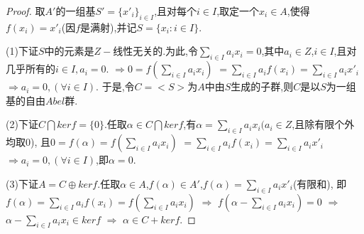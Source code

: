 \documentclass[UTF8]{article}
\begin{document}
\begin{proof}
	取$A'$的一组基$S'=\{x'_i\}_{i\in I}$,且对每个$i\in I$,取定一个$x_i\in A$,使得$f(x_i)=x'_i$(因$f$是满射),并记$S=\{x_i:i\in I\}$.
	
	(1)下证$S$中的元素是$Z-$线性无关的.为此,令$\sum\limits_{i\in I} a_ix_i=0$,其中$a_i\in Z$,$i\in I$,且对几乎所有的$i\in I,a_i=0$.
	$\Rightarrow 0=f(\sum\limits_{i\in I} a_ix_i)$  $=\sum\limits_{i\in I} a_if(x_i)=\sum\limits_{i\in I} a_ix'_i$  $\Rightarrow a_i=0,(\forall i\in I)$.
	于是,令$C=<S>$为$A$中由$S$生成的子群,则$C$是以$S$为一组基的自由$Abel$群.
	
	(2)下证$C\bigcap kerf=\{0\}$.任取$\alpha\in C\bigcap kerf$,有$\alpha=\sum\limits_{i\in I} a_ix_i(a_i\in Z$,且除有限个外均取0),
	且$0=f(\alpha)=f(\sum\limits_{i\in I} a_ix_i)$  $=\sum\limits_{i\in I} a_if(x_i)=\sum\limits_{i\in I} a_ix'_i$ $\Rightarrow a_i=0,(\forall i\in I)$,即$\alpha=0$.
	
	(3)下证$A=C\oplus kerf$.任取$\alpha\in A$,$f(\alpha)\in A'$,$f(\alpha)=\sum\limits_{i\in I} a_ix'_i$(有限和),
	即$f(\alpha)=\sum\limits_{i\in I} a_if(x_i)=f(\sum\limits_{i\in I} a_ix_i)$
	$\Rightarrow$  $f(\alpha-\sum\limits_{i\in I} a_ix_i)=0$
	$\Rightarrow$  $\alpha-\sum\limits_{i\in I} a_ix_i\in kerf$
	$\Rightarrow$  $\alpha\in C+kerf$.
	
	
\end{proof}
\end{document}
